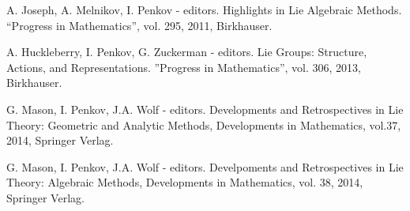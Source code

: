 \documentclass[11pt]{amsart}
\begin{document}
\myss \label{2.} A. Joseph, A. Melnikov, I. Penkov - editors. Highlights in Lie Algebraic Methods. ``Progress
in Mathematics'', vol. 295, 2011,  Birkhauser.

\myss \label{3.} A. Huckleberry, I. Penkov, G. Zuckerman - editors. Lie Groups: Structure, Actions, and Representations. ''Progress in Mathematics'', vol. 306, 2013, Birkhauser.

\myss \label{4.} G. Mason, I. Penkov, J.A. Wolf - editors. Developments and Retrospectives in Lie Theory: Geometric and Analytic Methods, Developments in Mathematics, vol.37, 2014, Springer Verlag.

\myss \label{5.} G. Mason, I. Penkov, J.A. Wolf - editors. Develpoments and Retrospectives in Lie Theory: Algebraic Methods, Developments in Mathematics, vol. 38, 2014, Springer Verlag.
\end{document}
